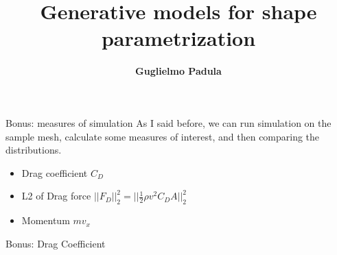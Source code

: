 \documentclass{beamer}
\title[Generative models for shape parametrization]{Generative models for shape parametrization}
\author[G. Padula]{\textbf{Guglielmo Padula}}
\institute{University of Trieste}
\date{}
\begin{document}
\begin{frame}{Bonus: measures of simulation}
As I said before, we can run simulation on the sample mesh, calculate some measures of interest, and then comparing the distributions. 
\begin{itemize}
\item Drag coefficient $C_{D}$ 
\item L2 of Drag force $||F_D||_{2}^{2}=||\frac{1}{2} \rho v^2 C_D A||_{2}^{2}$
\item Momentum $mv_{x}$
\end{itemize}
\end{frame}

\begin{frame}{Bonus: Drag Coefficient}
\end{frame}
\end{document}
